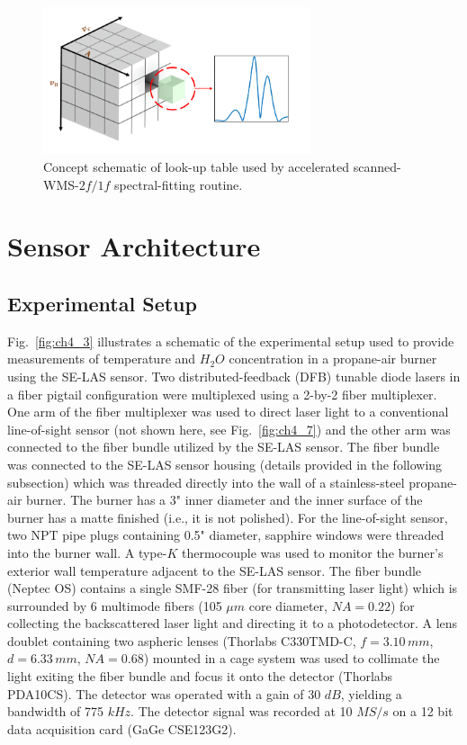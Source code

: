 \begin{figure}[b]
    \centering       
    \includegraphics[width=0.7\textwidth]{fig/ch4_fig4.png}
        \caption{Concept schematic of look-up table used by accelerated scanned-WMS-$2f/1f$ spectral-fitting routine.}
    \label{fig:ch4_2}
\end{figure}


\section{Sensor Architecture}
\subsection{Experimental Setup}

Fig.\ \ref{fig:ch4_3} illustrates a schematic of the experimental setup used to provide measurements of temperature and $H_2O$ concentration in a propane-air burner using the SE-LAS sensor. Two distributed-feedback (DFB) tunable diode lasers in a fiber pigtail configuration were multiplexed using a 2-by-2 fiber multiplexer. One arm of the fiber multiplexer was used to direct laser light to a conventional line-of-sight sensor (not shown here, see Fig.\ \ref{fig:ch4_7}) and the other arm was connected to the fiber bundle utilized by the SE-LAS sensor. The fiber bundle was connected to the SE-LAS sensor housing (details provided in the following subsection) which was threaded directly into the wall of a stainless-steel propane-air burner. The burner has a 3" inner diameter and the inner surface of the burner has a matte finished (i.e., it is not polished). For the line-of-sight sensor, two NPT pipe plugs containing 0.5" diameter, sapphire windows were threaded into the burner wall. A type-$K$ thermocouple was used to monitor the burner’s exterior wall temperature adjacent to the SE-LAS sensor. The fiber bundle (Neptec OS) contains a single SMF-28 fiber (for transmitting laser light) which is surrounded by 6 multimode fibers (105 $\mu m$ core diameter, $NA=0.22$) for collecting the backscattered laser light and directing it to a photodetector. A lens doublet containing two aspheric lenses (Thorlabs C330TMD-C, $f=3.10 \,mm$, $d=6.33 \,mm$, $NA=0.68$) mounted in a cage system was used to collimate the light exiting the fiber bundle and focus it onto the detector (Thorlabs PDA10CS). The detector was operated with a gain of 30 $dB$, yielding a bandwidth of 775 $kHz$. The detector signal was recorded at 10 $MS/s$ on a 12 bit data acquisition card (GaGe CSE123G2).


